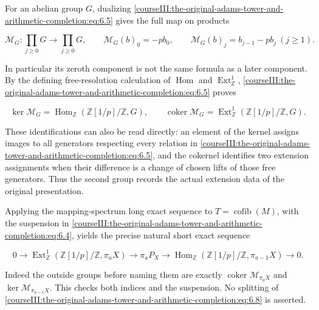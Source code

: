 For an abelian group \(G\), dualizing \eqref{courseIII:the-original-adams-tower-and-arithmetic-completion:eq:6.5} gives the full map on products

\begin{equation}
\mathcal M_G:\prod_{j\geq0}G\longrightarrow\prod_{j\geq0}G,
\qquad
\mathcal M_G(b)_0=-pb_0,
\qquad
\mathcal M_G(b)_j=b_{j-1}-pb_j\ (j\geq1).
\label{courseIII:the-original-adams-tower-and-arithmetic-completion:eq:6.6}
\end{equation}

In particular its zeroth component is not the same formula as a later component. By the defining free-resolution calculation of \(\operatorname{Hom}\) and \(\operatorname{Ext}^1_{\mathbb Z}\), \eqref{courseIII:the-original-adams-tower-and-arithmetic-completion:eq:6.5} proves

\begin{equation}
\ker\mathcal M_G=\operatorname{Hom}_{\mathbb Z}(\mathbb Z[1/p]/\mathbb Z,G),
\qquad
\operatorname{coker}\mathcal M_G=
\operatorname{Ext}^1_{\mathbb Z}(\mathbb Z[1/p]/\mathbb Z,G).
\label{courseIII:the-original-adams-tower-and-arithmetic-completion:eq:6.7}
\end{equation}

These identifications can also be read directly: an element of the kernel assigns images to all generators respecting every relation in \eqref{courseIII:the-original-adams-tower-and-arithmetic-completion:eq:6.5}, and the cokernel identifies two extension assignments when their difference is a change of chosen lifts of those free generators. Thus the second group records the actual extension data of the original presentation.

Applying the mapping-spectrum long exact sequence to \(T=\operatorname{cofib}(M)\), with the suspension in \eqref{courseIII:the-original-adams-tower-and-arithmetic-completion:eq:6.4}, yields the precise natural short exact sequence

\begin{equation}
0\longrightarrow
\operatorname{Ext}^1_{\mathbb Z}(\mathbb Z[1/p]/\mathbb Z,\pi_aX)
\longrightarrow\pi_aP_X
\longrightarrow
\operatorname{Hom}_{\mathbb Z}(\mathbb Z[1/p]/\mathbb Z,\pi_{a-1}X)
\longrightarrow0.
\label{courseIII:the-original-adams-tower-and-arithmetic-completion:eq:6.8}
\end{equation}

Indeed the outside groups before naming them are exactly
\(\operatorname{coker}\mathcal M_{\pi_aX}\) and
\(\ker\mathcal M_{\pi_{a-1}X}\). This checks both indices and the suspension. No splitting of \eqref{courseIII:the-original-adams-tower-and-arithmetic-completion:eq:6.8} is asserted.

